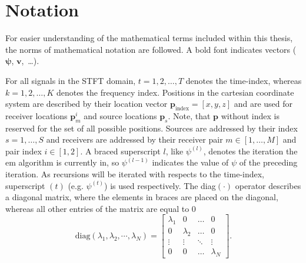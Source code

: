 \section{Notation}
\label{chap:1notation}

For easier understanding of the mathematical terms included within this thesis, the norms of mathematical notation are followed. A bold font indicates vectors ($\bm\psi$, $\bm v$,~\dots).

For all signals in the STFT domain, $t=1,2,\dots, T$ denotes the time-index, whereas $k=1,2,\dots,K$ denotes the frequency index.
Positions in the cartesian coordinate system are described by their location vector $\bm p_{\text{index}}=[x, y, z]$ and are used for receiver locations $\bm p_m^i$ and source locations $\bm p_s$. Note, that $\bm p$ without index is reserved for the set of all possible positions. Sources are addressed by their index $s=1,\dots,S$ and receivers are addressed by their receiver pair $m\in[1, \dots, M]$ and pair index $i\in[1, 2]$. A braced superscript $l$, like $\psi^{(l)}$, denotes the iteration the \gls{em} algorithm is currently in, so $\psi^{(l-1)}$ indicates the value of $\psi$ of the preceding iteration. As recursions will be iterated with respects to the time-index, superscript $(t)$ (e.g. $\psi^{(t)}$) is used respectively. The diag$(\cdot)$ operator describes a diagonal matrix, where the elements in braces are placed on the diagonal, whereas all other entries of the matrix are equal to 0
\begin{equation}
    \text{diag}(\lambda_1, \lambda_2, \cdots, \lambda_N)=
    \begin{bmatrix}
    \lambda_1 &     0     & \dots  & 0 \\
       0      & \lambda_2 & \dots  & 0 \\
       \vdots &     \vdots     & \ddots & \vdots\\
    0         &     0     & \dots  &  \lambda_N
\end{bmatrix}.    
\end{equation}
